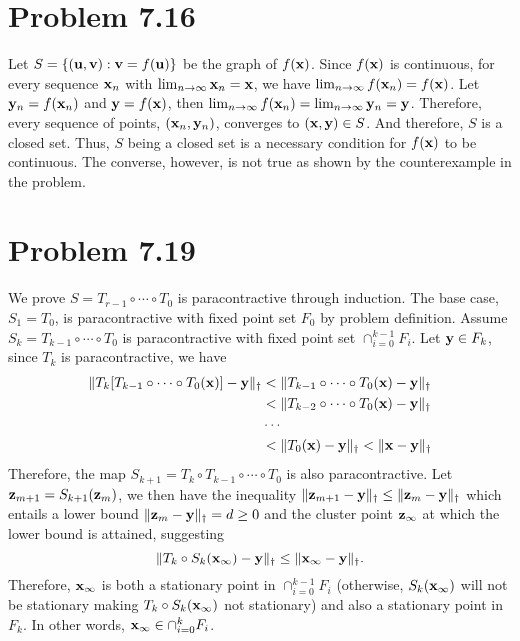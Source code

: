 \documentclass{scrartcl}
\begin{document}

\section*{Problem 7.16}

Let $S = \{(\mathbf{u},\mathbf{v}) : \mathbf{v} = f(\mathbf{u})\}$ be the graph of $f(\mathbf{x})$.
Since $f(\mathbf{x})$ is continuous, for every sequence $\mathbf{x}_n$ with $\lim_{n \rightarrow \infty} \mathbf{x}_n = \mathbf{x}$, we have
$\lim_{n \rightarrow \infty} f(\mathbf{x}_n) = f(\mathbf{x})$. Let $\mathbf{y}_n = f(\mathbf{x}_n)$ and $\mathbf{y} = f(\mathbf{x})$,
then $\lim_{n \rightarrow \infty} f(\mathbf{x}_n) = \lim_{n \rightarrow \infty} \mathbf{y}_n = \mathbf{y}$. Therefore, every sequence
of points, $(\mathbf{x}_n, \mathbf{y}_n)$, converges to $(\mathbf{x}, \mathbf{y}) \in S$. And therefore,
$S$ is a closed set. Thus, $S$ being a closed set is a necessary condition for $f(\mathbf{x})$ to be continuous. The converse, however, is not true
as shown by the counterexample in the problem.


\section*{Problem 7.19}

We prove $S = T_{r-1} \circ \cdots \circ T_0$ is paracontractive through induction. The base case, $S_1 = T_0$, is paracontractive with fixed point set $F_0$
by problem definition. Assume $S_{k} = T_{k-1} \circ \cdots \circ T_0$ is paracontractive with fixed point set $\cap_{i=0}^{k-1} F_i$.
Let $\mathbf{y} \in F_k$, since $T_{k}$ is paracontractive, we have
\begin{equation}
\begin{split}
\| T_k [ T_{k-1} \circ \cdots \circ T_0 (\mathbf{x}) ] - \mathbf{y} \|_\dagger
& < \| T_{k-1} \circ \cdots \circ T_0 (\mathbf{x}) - \mathbf{y} \|_\dagger \\
& < \| T_{k-2} \circ \cdots \circ T_0 (\mathbf{x}) - \mathbf{y} \|_\dagger \\
& \cdots \\
& < \|T_0 (\mathbf{x}) - \mathbf{y} \|_\dagger < \|\mathbf{x} - \mathbf{y}\|_\dagger
\end{split}
\end{equation}
Therefore, the map $S_{k+1} = T_{k} \circ T_{k-1} \circ \cdots \circ T_0$ is also paracontractive. 
Let $\mathbf{z}_{m+1} = S_{k+1}(\mathbf{z}_m)$, we then have the inequality $\| \mathbf{z}_{m+1} - \mathbf{y} \|_\dagger \le \| \mathbf{z}_m - \mathbf{y} \|_\dagger $
which entails a lower bound $\| \mathbf{z}_m - \mathbf{y} \|_\dagger = d \ge 0$ and the cluster point $\mathbf{z}_{\infty}$ at which the lower bound is attained, suggesting
\begin{equation}
\| T_{k} \circ S_{k} (\mathbf{x}_\infty) - \mathbf{y}\|_\dagger \le \|\mathbf{x}_\infty - \mathbf{y}\|_\dagger.
\end{equation}
Therefore, $\mathbf{x}_\infty$ is both a stationary point in $\cap_{i=0}^{k-1} F_i$ (otherwise, $S_{k} (\mathbf{x}_\infty)$ will not be stationary making
$T_k \circ S_{k} (\mathbf{x}_\infty)$ not stationary) and also a stationary point in $F_k$. In other words, $\mathbf{x}_\infty \in \cap_{i=0}^{k} F_i$.
\end{document}
